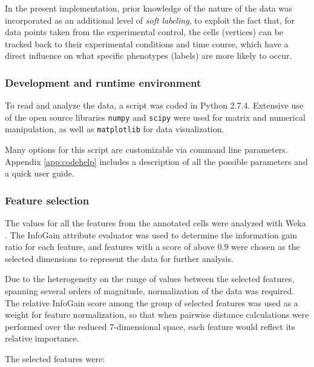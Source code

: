 \documentclass[oneside, a4paper, draft]{memoir} %
\begin{document}
In the present implementation, prior knowledge of the nature of the data was incorporated as an additional level of
\emph{soft labeling}, to exploit the fact that, for data points taken from the experimental control, the cells
(vertices) can be tracked back to their experimental conditions and time course, which have a direct influence on what
specific phenotypes (labels) are more likely to occur.

\subsubsection{Development and runtime environment}
To read and analyze the data, a script was coded in Python 2.7.4. Extensive use of the open source libraries
\texttt{numpy} and \texttt{scipy} were used for matrix and numerical manipulation, as well as \texttt{matplotlib} for
data visualization.

Many options for this script are customizable via command line parameters. Appendix \ref{app:codehelp} includes a
description of all the possible parameters and a quick user guide.

\subsubsection{Feature selection}
The values for all the features from the annotated cells were analyzed with Weka \cite{hall2009weka}. The InfoGain
attribute evaluator was used to determine the information gain ratio for each feature, and features with a score of
above  0.9 were chosen as the selected dimensions to represent
the data for further analysis.

Due to the heterogeneity on the range of values between the selected features, spanning 
several orders of magnitude, normalization of the data was required. The relative
 InfoGain score among the group of
selected features was used as a weight for feature normalization, so that when pairwise distance calculations were 
performed over the reduced 7-dimensional space, each feature would reflect its relative importance.

The selected features were: 
\end{document}
